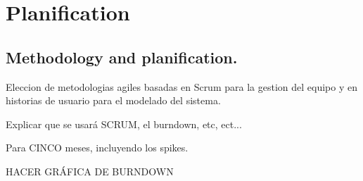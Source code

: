 \chapter{Planification}
\section{Methodology and planification.}

Eleccion de metodologias agiles basadas en Scrum para la gestion del
equipo y en historias de usuario para el modelado del sistema.

Explicar que se usará SCRUM, el burndown, etc, ect...

Para CINCO meses, incluyendo los spikes.


HACER GRÁFICA DE BURNDOWN
